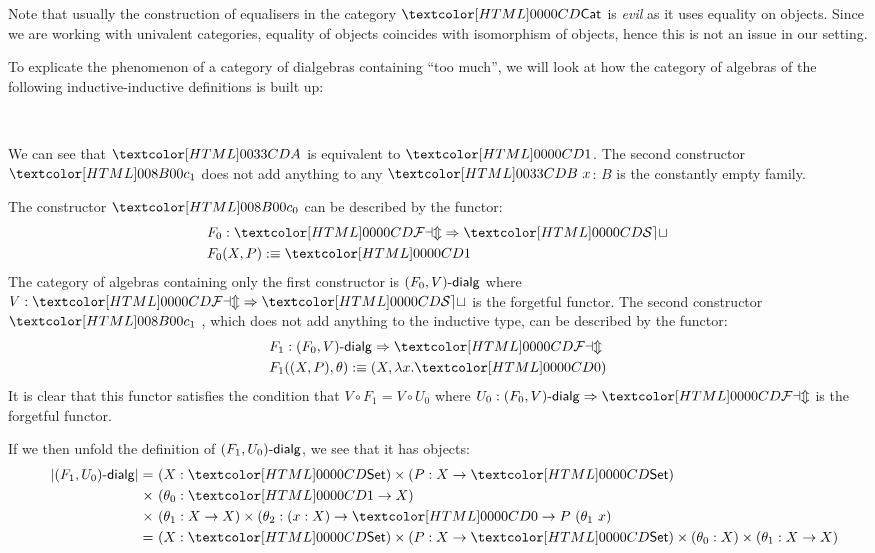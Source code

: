 Note that usually the construction of equalisers in the category
$\Cat$ is \emph{evil} as it uses equality on objects. Since we are
working with univalent categories, equality of objects coincides with
isomorphism of objects, hence this is not an issue in our setting.

\begin{remark}
  To explicate the phenomenon of a category of dialgebras containing
  ``too much'', we will look at how the category of algebras of the
  following inductive-inductive definitions is built up:
  \begin{sorts}
    \sortnamety{\Aty}{\Set} \\
    \sortnamety{\Bty}{\Aty \to \Set}
  \end{sorts}
  \begin{datatype}{\Aty}{}
    \constr{\Aco}{\Aty}
  \end{datatype}
  \begin{datatype}{\Bty}{}
  \end{datatype}
  We can see that $\Aty$ is equivalent to $\unitty$. The second
  constructor $\Bci$ does not add anything to any $\Bty\ x$: $B$ is
  the constantly empty family.

  The constructor $\Aco$ can be described by
  the functor:
  \begin{align*}
    &F_0 : \Func{\FAM}{\SET} \\
    &F_0 (X , P) \ddefeq \unitty
  \end{align*}
  The category of algebras containing only the first constructor is
  $\dialgcat{F_0}{V}$ where $V : \Func{\FAM}{\SET}$ is the forgetful
  functor. The second constructor $\Bci$ , which does not add anything
  to the inductive type, can be described by the functor:
  \begin{align*}
    &F_1 : \Func{\dialgcat{F_0}{V}}{\FAM} \\
    &F_1 ((X , P) , \theta) \ddefeq (X , \lambda x . \emptyty)
  \end{align*}
  It is clear that this functor satisfies the condition that
  $V \circ F_1 = V \circ U_0$ where
  $U_0 : \Func{\dialgcat{F_0}{V}}{\FAM}$ is the forgetful functor.

  If we then unfold the definition of $\dialgcat{F_1}{U_0}$, we see
  that it has objects:
  \begin{align*}
    &&| \dialgcat{F_1}{U_0} | = &\ (X : \Set) \times (P : X \to \Set) \\
    &&\times&\ (\theta_0 : \unitty \to X) \\
    &&\times&\ (\theta_1 : X \to X) \times (\theta_2 :  (x : X) \to \emptyty \to P\ (\theta_1\ x) \\
    &&=&\ (X : \Set) \times (P : X \to \Set) \times (\theta_0 : X) \times (\theta_1 : X \to X)
  \end{align*}
  

\end{remark}

